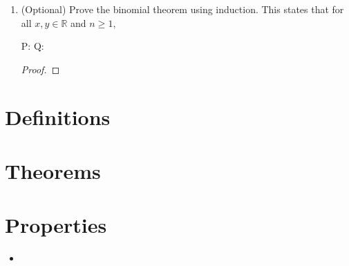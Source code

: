 \documentclass{article} %
\theoremstyle{plain}
\theoremstyle{definition}
\theoremstyle{case}
\begin{document}
\begin{enumerate}[label={\fbox{\textbf{Exercise \#\arabic* :}}}]
  \renewcommand\qedsymbol{\Lightning}
  \begin{proof}[\textbf{Proof by contradiction}]  Towards a contradiction,
    Let's assume that there is some rational number, $x = p/q$, where
    gcd($p,q) = 1$, which is a solution to this equation.
  \end{proof} 
  \renewcommand\qedsymbol{$\square$}
\newpage
\item (Optional) Prove the binomial theorem using induction. This states that for all $x,y \in \mathbb{R}$ and $n\geq 1$,


P: 
Q:

\begin{proof}
\end{proof} 

\newpage
\end{enumerate}

\newpage

\section*{Definitions}

\section*{Theorems}

\section*{Properties}
  \begin{itemize}
        \item
  \end{itemize}
\end{document}
